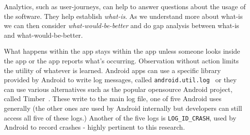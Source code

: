 Analytics, such as user-journeys, can help to answer questions about the usage of the software. They help establish \emph{what-is}. As we understand more about what-is we can then consider \emph{what-would-be-better} and do gap analysis between what-is and what-would-be-better.

What happens within the app stays within the app unless someone looks inside the app or the app reports what's occurring. Observation without action limits the utility of whatever is learned.  Android apps can use a specific library provided by Android to write log messages, called \texttt{android.util.log}~ or they can use various alternatives such as the popular opensource Android project, called Timber~. These write to the main log file, one of five Android uses generally (the other ones are used by Android internally but developers can still access all five of these logs.) Another of the five logs is \texttt{LOG\_ID\_CRASH}, used by Android to record crashes - highly pertinent to this research.~

